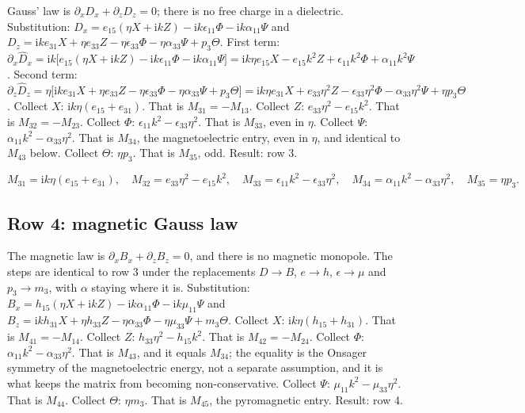 \documentclass[11pt]{article}
\makeatletter
\newif\ifshowworked
\newenvironment{worked}{%
  \ifshowworked\par\smallskip\noindent\textit{Working.}\par\smallskip\else
  \setbox\z@\vbox\bgroup\fi}{\ifshowworked\par\smallskip\else\egroup\fi}
\newcommand{\ii}{\mathrm{i}}
\makeatother
\begin{document}
\begin{worked}
Gauss' law is $\partial_xD_x+\partial_zD_z=0$; there is no free charge in a dielectric.
Substitution: $D_x=e_{15}(\eta X+\ii kZ)-\ii k\epsilon_{11}\Phi-\ii k\alpha_{11}\Psi$ and
$D_z=\ii ke_{31}X+\eta e_{33}Z-\eta\epsilon_{33}\Phi-\eta\alpha_{33}\Psi+p_3\Theta$.
First term: $\partial_x\hat D_x=\ii k\bigl[e_{15}(\eta X+\ii kZ)-\ii k\epsilon_{11}\Phi
-\ii k\alpha_{11}\Psi\bigr]=\ii k\eta e_{15}X-e_{15}k^2Z+\epsilon_{11}k^2\Phi+\alpha_{11}k^2\Psi$.
Second term: $\partial_z\hat D_z=\eta\bigl[\ii ke_{31}X+\eta e_{33}Z-\eta\epsilon_{33}\Phi
-\eta\alpha_{33}\Psi+p_3\Theta\bigr]
=\ii k\eta e_{31}X+e_{33}\eta^2Z-\epsilon_{33}\eta^2\Phi-\alpha_{33}\eta^2\Psi+\eta p_3\Theta$.
Collect $X$: $\ii k\eta(e_{15}+e_{31})$. That is $M_{31}=-M_{13}$.
Collect $Z$: $e_{33}\eta^2-e_{15}k^2$. That is $M_{32}=-M_{23}$.
Collect $\Phi$: $\epsilon_{11}k^2-\epsilon_{33}\eta^2$. That is $M_{33}$, even in $\eta$.
Collect $\Psi$: $\alpha_{11}k^2-\alpha_{33}\eta^2$. That is $M_{34}$, the magnetoelectric entry, even in
$\eta$, and identical to $M_{43}$ below.
Collect $\Theta$: $\eta p_3$. That is $M_{35}$, odd.
Result: row 3.
\end{worked}

\begin{equation}
M_{31}=\ii k\eta(e_{15}+e_{31}),\quad
M_{32}=e_{33}\eta^2-e_{15}k^2,\quad
M_{33}=\epsilon_{11}k^2-\epsilon_{33}\eta^2,\quad
M_{34}=\alpha_{11}k^2-\alpha_{33}\eta^2,\quad
M_{35}=\eta p_3 .
\end{equation}

\subsection*{Row 4: magnetic Gauss law}

\begin{worked}
The magnetic law is $\partial_xB_x+\partial_zB_z=0$, and there is no magnetic monopole. The steps are
identical to row 3 under the replacements $D\to B$, $e\to h$, $\epsilon\to\mu$ and $p_3\to m_3$, with
$\alpha$ staying where it is. Substitution:
$B_x=h_{15}(\eta X+\ii kZ)-\ii k\alpha_{11}\Phi-\ii k\mu_{11}\Psi$ and
$B_z=\ii kh_{31}X+\eta h_{33}Z-\eta\alpha_{33}\Phi-\eta\mu_{33}\Psi+m_3\Theta$.
Collect $X$: $\ii k\eta(h_{15}+h_{31})$. That is $M_{41}=-M_{14}$.
Collect $Z$: $h_{33}\eta^2-h_{15}k^2$. That is $M_{42}=-M_{24}$.
Collect $\Phi$: $\alpha_{11}k^2-\alpha_{33}\eta^2$. That is $M_{43}$, and it equals $M_{34}$; the equality
is the Onsager symmetry of the magnetoelectric energy, not a separate assumption, and it is what keeps
the matrix from becoming non-conservative.
Collect $\Psi$: $\mu_{11}k^2-\mu_{33}\eta^2$. That is $M_{44}$.
Collect $\Theta$: $\eta m_3$. That is $M_{45}$, the pyromagnetic entry.
Result: row 4.
\end{worked}
\end{document}
